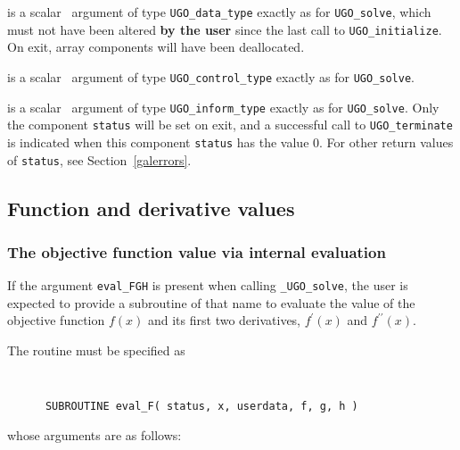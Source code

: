 \documentclass{galahad}
\newcommand{\packagename}{UGO}
\newcommand{\fullpackagename}{\libraryname\_\packagename}
\newcommand{\solver}{{\tt \fullpackagename\_solve}}
\begin{document}
\vspace*{-1mm}
\begin{description}

 is a scalar \intentinout\ argument of type
{\tt \packagename\_data\_type}
exactly as for
{\tt \packagename\_solve},
which must not have been altered {\bf by the user} since the last call to
{\tt \packagename\_initialize}.
On exit, array components will have been deallocated.

 is a scalar \intentin\ argument of type
{\tt \packagename\_control\_type}
exactly as for
{\tt \packagename\_solve}.

 is a scalar \intentout\ argument of type
{\tt \packagename\_inform\_type}
exactly as for
{\tt \packagename\_solve}.
Only the component {\tt status} will be set on exit, and a
successful call to
{\tt \packagename\_terminate}
is indicated when this  component {\tt status} has the value 0.
For other return values of {\tt status}, see Section~\ref{galerrors}.

\end{description}


\subsection{Function and derivative values\label{fdv}}


\subsubsection{The objective function value via internal evaluation\label{fghfv}}

If the argument {\tt eval\_FGH} is present when calling \solver, the
user is expected to provide a subroutine of that name to evaluate the
value of the objective function $f(x)$ and its first two derivatives,
$f^{\prime}(x)$ and $f^{\prime\prime}(x)$.

The routine must be specified as

\def\baselinestretch{0.8}
{\tt
\begin{verbatim}
      SUBROUTINE eval_F( status, x, userdata, f, g, h )
\end{verbatim}
}
\def\baselinestretch{1.0}
\noindent whose arguments are as follows:
\end{document}
